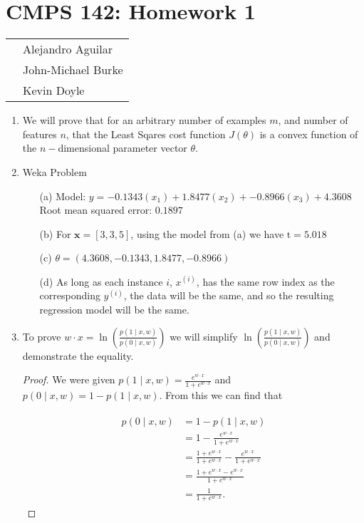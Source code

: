 \documentclass[12pt]{article}
\begin{document}
\section*{CMPS 142: Homework 1}

\begin{tabular}{p{10cm} l}
    & Alejandro Aguilar \\
    & John-Michael Burke \\
    & Kevin Doyle \\
\end{tabular}
    
\begin{enumerate}
  \item We will prove that for an arbitrary number of examples $m$, and number of features $n$, that the Least Sqares cost function $J(\theta)$ is a convex function of the $n-$dimensional parameter vector $\theta$.
  \item Weka Problem
  	\begin{enumerate}
  	\item[(a)] Model: $y= -0.1343(x_1) + 1.8477(x_2) + -0.8966(x_3) + 4.3608$ \\
  	Root mean squared error: $0.1897$
  	\item[(b)] For $\textbf{x} = [3,3,5]$, using the model from (a) we have $\text{\^{t}} = 5.018$
  	\item[(c)] $\theta = (4.3608, -0.1343, 1.8477, -0.8966)$ 
  	\item[(d)] As long as each instance $i$, $x^{(i)}$, has the same row index as the corresponding $y^{(i)}$, the data will be the same, and so the resulting regression model will be the same. 
  	\end{enumerate}
  \item To prove $ w \cdot x = \ln\left( \frac{p(1\mid x,w)}{p(0\mid x,w)}\right)  $ we will simplify $\ln\left( \frac{p(1\mid x,w)}{p(0\mid x,w)}\right) $ and demonstrate the equality.
  
   \begin{proof}We were given $p(1\mid x,w) =\frac{e^{w \cdot x}}{1 + e^{w \cdot x}}$ and $p(0\mid x,w) = 1 - p(1\mid x,w)$. From this we can find that 
    
	\begin{align*}
	\begin{split}
	p(0\mid x,w) &= 1 - p(1\mid x,w) \\
	&= 1 - \frac{e^{w \cdot x}}{1 + e^{w \cdot x}} \\
	&= \frac{1 + e^{w \cdot x}}{1 + e^{w \cdot x}} - \frac{e^{w \cdot x}}{1 + e^{w \cdot x}} \\
	&= \frac{1 + e^{w \cdot x} - e^{w \cdot x}}{1 + e^{w \cdot x}} \\
	&= \frac{1}{1 + e^{w \cdot x}} .
	\end{split}
	\end{align*}
   

\end{proof}
\end{enumerate}
\end{document}
